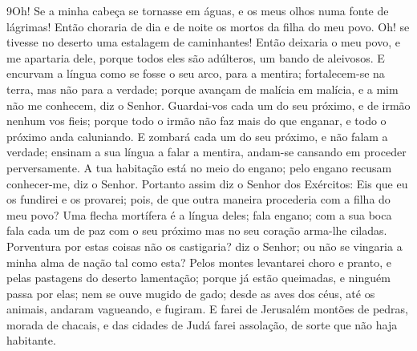 \medskip

\lettrine{9} Oh! Se a minha cabeça se tornasse em águas, e os
meus olhos numa fonte de lágrimas! Então choraria de dia e de noite
os mortos da filha do meu povo. Oh! se tivesse no deserto uma
estalagem de caminhantes! Então deixaria o meu povo, e me apartaria
dele, porque todos eles são adúlteros, um bando de aleivosos. E
encurvam a língua como se fosse o seu arco, para a mentira;
fortalecem-se na terra, mas não para a verdade; porque avançam de
malícia em malícia, e a mim não me conhecem, diz o Senhor.
Guardai-vos cada um do seu próximo, e de irmão nenhum vos fieis;
porque todo o irmão não faz mais do que enganar, e todo o próximo
anda caluniando. E zombará cada um do seu próximo, e não falam a
verdade; ensinam a sua língua a falar a mentira, andam-se cansando
em proceder perversamente. A tua habitação está no meio do
engano; pelo engano recusam conhecer-me, diz o Senhor. Portanto
assim diz o Senhor dos Exércitos: Eis que eu os fundirei e os
provarei; pois, de que outra maneira procederia com a filha do meu
povo? Uma flecha mortífera é a língua deles; fala engano; com a
sua boca fala cada um de paz com o seu próximo mas no seu coração
arma-lhe ciladas. Porventura por estas coisas não os castigaria?
diz o Senhor; ou não se vingaria a minha alma de nação tal como
esta? Pelos montes levantarei choro e pranto, e pelas
pastagens do deserto lamentação; porque já estão queimadas, e
ninguém passa por elas; nem se ouve mugido de gado; desde as aves
dos céus, até os animais, andaram vagueando, e fugiram. E
farei de Jerusalém montões de pedras, morada de chacais, e das
cidades de Judá farei assolação, de sorte que não haja habitante.

